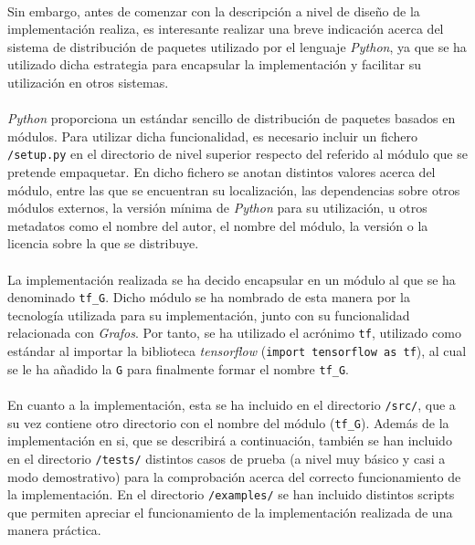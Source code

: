 \documentclass{subfiles}
\begin{document}
        \paragraph{}
        Sin embargo, antes de comenzar con la descripción a nivel de diseño de la implementación realiza, es interesante realizar una breve indicación acerca del sistema de distribución de paquetes utilizado por el lenguaje \emph{Python}, ya que se ha utilizado dicha estrategia para encapsular la implementación y facilitar su utilización en otros sistemas.

        \paragraph{}
        \emph{Python} proporciona un estándar sencillo de distribución de paquetes basados en módulos. Para utilizar dicha funcionalidad, es necesario incluir un fichero \texttt{/setup.py} en el directorio de nivel superior respecto del referido al módulo que se pretende empaquetar. En dicho fichero se anotan distintos valores acerca del módulo, entre las que se encuentran su localización, las dependencias sobre otros módulos externos, la versión mínima de \emph{Python} para su utilización, u otros metadatos como el nombre del autor, el nombre del módulo, la versión o la licencia sobre la que se distribuye.

        \paragraph{}
        La implementación realizada se ha decido encapsular en un módulo al que se ha denominado \texttt{tf\_G}. Dicho módulo se ha nombrado de esta manera por la tecnología utilizada para su implementación, junto con su funcionalidad relacionada con \emph{Grafos}. Por tanto, se ha utilizado el acrónimo \texttt{tf}, utilizado como estándar al importar la biblioteca \emph{tensorflow} (\texttt{import tensorflow as tf}), al cual se le ha añadido la \texttt{G} para finalmente formar el nombre \texttt{tf\_G}.

        \paragraph{}
        En cuanto a la implementación, esta se ha incluido en el directorio \texttt{/src/}, que a su vez contiene otro directorio con el nombre del módulo (\texttt{tf\_G}). Además de la implementación en si, que se describirá a continuación, también se han incluido en el directorio \texttt{/tests/} distintos casos de prueba (a nivel muy básico y casi a modo demostrativo) para la comprobación acerca del correcto funcionamiento de la implementación. En el directorio \texttt{/examples/} se han incluido distintos scripts que permiten apreciar el funcionamiento de la implementación realizada de una manera práctica.
\end{document}
